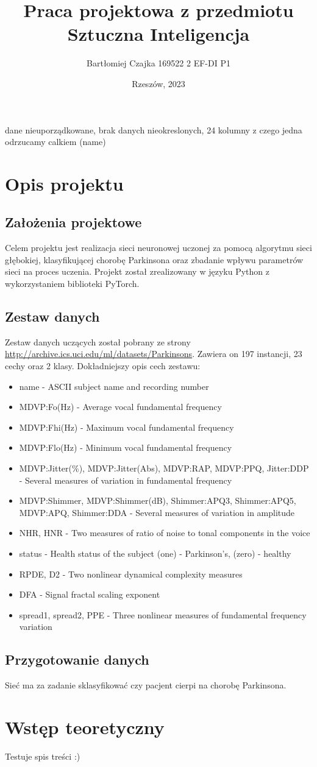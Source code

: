\documentclass{article}
\title{\textbf{Praca projektowa z przedmiotu Sztuczna Inteligencja}}
\author{Bartłomiej Czajka 169522 2 EF-DI P1}
\date{Rzeszów, 2023}
\begin{document}
\maketitle
\pagebreak
dane nieuporządkowane, brak danych nieokreslonych,
24 kolumny z czego jedna odrzucamy calkiem (name)


\tableofcontents{}
\section{Opis projektu}
\subsection{Założenia projektowe}
Celem projektu jest realizacja sieci neuronowej uczonej za pomocą algorytmu sieci głębokiej, klasyfikującej chorobę Parkinsona oraz zbadanie wpływu parametrów sieci na proces uczenia.
Projekt został zrealizowany w języku Python z wykorzystaniem biblioteki PyTorch.
\subsection{Zestaw danych}
Zestaw danych uczących został pobrany ze strony \href{http://archive.ics.uci.edu/ml/datasets/Parkinsons}{http://archive.ics.uci.edu/ml/datasets/Parkinsons}.
Zawiera on 197 instancji, 23 cechy oraz 2 klasy.
Dokładniejszy opis cech zestawu:
\begin{itemize}
    \item name - ASCII subject name and recording number
    \item MDVP:Fo(Hz) - Average vocal fundamental frequency
    \item MDVP:Fhi(Hz) - Maximum vocal fundamental frequency
    \item MDVP:Flo(Hz) - Minimum vocal fundamental frequency
    \item MDVP:Jitter(\%), MDVP:Jitter(Abs), MDVP:RAP, MDVP:PPQ, Jitter:DDP - Several measures of variation in fundamental frequency
    \item MDVP:Shimmer, MDVP:Shimmer(dB), Shimmer:APQ3, Shimmer:APQ5, MDVP:APQ, Shimmer:DDA - Several measures of variation in amplitude
    \item NHR, HNR - Two measures of ratio of noise to tonal components in the voice
    \item status - Health status of the subject (one) - Parkinson's, (zero) - healthy
    \item RPDE, D2 - Two nonlinear dynamical complexity measures
    \item DFA - Signal fractal scaling exponent
    \item spread1, spread2, PPE - Three nonlinear measures of fundamental frequency variation
\end{itemize}
\subsection{Przygotowanie danych}
Sieć ma za zadanie sklasyfikować czy pacjent cierpi na chorobę Parkinsona.
\section{Wstęp teoretyczny}
Testuje spis treści :)
\end{document}
